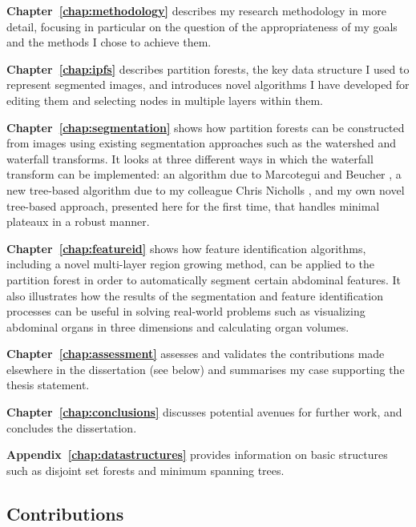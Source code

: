 \textbf{Chapter~\ref{chap:methodology}} describes my research methodology in more detail, focusing in particular on the question of the appropriateness of my goals and the methods I chose to achieve them.

\textbf{Chapter~\ref{chap:ipfs}} describes partition forests, the key data structure I used to represent segmented images, and introduces novel algorithms I have developed for editing them and selecting nodes in multiple layers within them.

\textbf{Chapter~\ref{chap:segmentation}} shows how partition forests can be constructed from images using existing segmentation approaches such as the watershed and waterfall transforms. It looks at three different ways in which the waterfall transform can be implemented: an algorithm due to Marcotegui and Beucher \cite{marcotegui05}, a new tree-based algorithm due to my colleague Chris Nicholls \cite{nicholls09}, and my own novel tree-based approach, presented here for the first time, that handles minimal plateaux in a robust manner.

\textbf{Chapter~\ref{chap:featureid}} shows how feature identification algorithms, including a novel multi-layer region growing method, can be applied to the partition forest in order to automatically segment certain abdominal features. It also illustrates how the results of the segmentation and feature identification processes can be useful in solving real-world problems such as visualizing abdominal organs in three dimensions and calculating organ volumes.

\textbf{Chapter~\ref{chap:assessment}} assesses and validates the contributions made elsewhere in the dissertation (see below) and summarises my case supporting the thesis statement.

\textbf{Chapter~\ref{chap:conclusions}} discusses potential avenues for further work, and concludes the dissertation.

\textbf{Appendix~\ref{chap:datastructures}} provides information on basic structures such as disjoint set forests and minimum spanning trees.

\subsection{Contributions}

